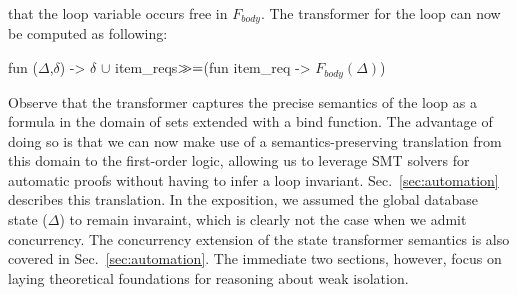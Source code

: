 that the loop variable  occurs free in $F_{body}$. The
transformer for the  loop can now be computed as following:
\begin{ocaml}
  fun ($\Delta$,$\delta$) -> $\delta$ $\cup$ item_reqs$\gg=$(fun item_req -> $F_{body}(\Delta)$)
\end{ocaml}
Observe that the transformer captures the precise semantics of the
 loop as a formula in the domain of sets extended with a
bind function. The advantage of doing so is that we can now make use
of a  semantics-preserving translation from this domain to the
first-order logic, allowing us to leverage SMT solvers for automatic
proofs without having to infer a loop invariant.
Sec.~\ref{sec:automation} describes this translation. In the
exposition, we assumed the global database state ($\Delta$) to remain
invaraint, which is clearly not the case when we admit concurrency.
The concurrency extension of the state transformer semantics is also
covered in Sec.~\ref{sec:automation}. The immediate two sections,
however, focus on laying theoretical foundations for reasoning about
weak isolation.
